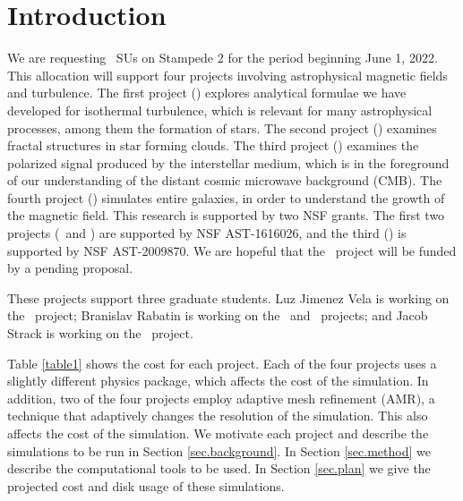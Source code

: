\section{Introduction}
\label{sec.intro}

We are requesting \SUtotal\ SUs on Stampede 2 for the period beginning June 1,
2022.  This allocation will support four projects involving astrophysical
magnetic fields and turbulence.  The first project (\nameTurbulence) explores analytical
formulae we have developed for isothermal turbulence, which is relevant for many
astrophysical processes, among them the formation of stars.  The second project
(\nameCores) examines fractal structures in star forming clouds.
  The third project (\nameCMB) examines the polarized signal
produced by the interstellar medium, which is in the foreground of our understanding of
the distant cosmic microwave background (CMB). The fourth project (\nameGalaxies)
simulates entire galaxies, in order to understand the growth of the magnetic
field.
This research is supported by two NSF grants.  The first two projects
(\nameTurbulence\ and \nameCores)  
are
supported by NSF AST-1616026, and the third (\nameCMB) is supported by 
NSF AST-2009870.
We are hopeful that the \nameGalaxies\ project will be funded by a pending
proposal.

These projects support three graduate students.  Luz Jimenez Vela is working on
the \nameCores\ project; Branislav Rabatin is working on the \nameTurbulence\
and \nameCMB\ projects; and Jacob Strack is working on the \nameGalaxies\
project.


Table \ref{table1} shows the cost for each project.  Each of the four projects
uses a slightly different physics package, which affects  the cost of the
simulation.  In addition, two of the four projects employ adaptive mesh
refinement (AMR), a technique that adaptively changes the resolution of the
simulation.  This also affects the cost of the simulation.
We motivate each project and describe the simulations to be
run in Section
\ref{sec.background}.  In Section \ref{sec.method} we
describe the computational tools to be used.  In Section \ref{sec.plan} we
give the projected cost  and disk usage of these simulations.

